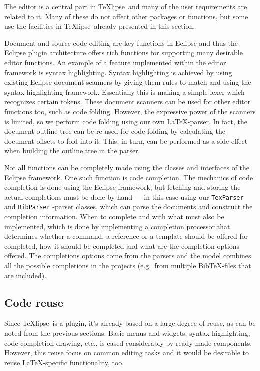 \documentclass[a4paper,11pt,twoside]{article}
\newcommand{\texlipse}{\TeX lipse}
\begin{document}
The editor is a central part in \texlipse\ and many of the user requirements 
are related to it. Many of these do not affect other packages or functions, but 
some use the facilities in \texlipse\ already presented in this section.

Document and source code editing are key functions in Eclipse and thus the 
Eclipse plugin architecture offers rich functions for supporting many desirable 
editor functions. An example of a feature implemented within the editor 
framework is syntax highlighting. Syntax highlighting is achieved by using 
existing Eclipse document scanners by giving them rules to match and using the 
syntax highlighting framework. Essentially this is making a simple lexer which 
recognizes certain tokens. These document scanners can be used for other editor 
functions too, such as code folding. However, the expressive power of the 
scanners is limited, so we perform code folding using our own \LaTeX -parser. 
In fact, the document outline tree can be re-used for code folding by 
calculating the document offsets to fold into it. This, in turn, can be 
performed as a side effect when building the outline tree in the parser.

Not all functions can be completely made using the classes and interfaces of 
the Eclipse framework. One such function is code completion. The mechanics of 
code completion is done using the Eclipse framework, but fetching and storing 
the actual completions must be done by hand --- in this case using our 
\texttt{TexParser} and \texttt{BibParser} -parser classes, which can parse the 
documents and construct the completion information. When to complete and with
what must also be implemented, which is done by implementing a completion
processor that determines whether a command, a reference or a template should be
offered for completed, how it should be completed and what are the completion
options offered. The completions options come from the parsers and the model
combines all the possible completions in the projects (e.g.\ from multiple
Bib\TeX -files that are included).


\subsection{Code reuse}

Since \texlipse\ is a plugin, it's already based on a large degree of
reuse, as can be noted from the previous sections. Basic menus and widgets,
syntax highlighting, code completion drawing, etc., is eased considerably
by ready-made components. However, this reuse focus on common editing
tasks and it would be desirable to reuse \LaTeX -specific functionality,
too.
\end{document}
